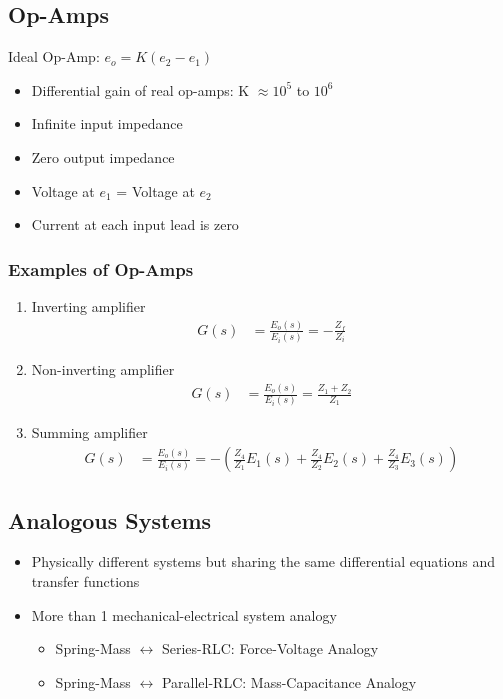 \documentclass[a4paper]{article}
\begin{document}
\subsection{Op-Amps}
\begin{center}
    Ideal Op-Amp: $e_o = K(e_2-e_1)$
\end{center}
\begin{itemize}
    \item Differential gain of real op-amps: K $\approx 10^5$ to $10^6$
    \item Infinite input impedance
    \item Zero output impedance
    \item Voltage at $e_1$ = Voltage at $e_2$
    \item Current at each input lead is zero
\end{itemize}
\subsubsection{Examples of Op-Amps}
\begin{enumerate}[label=\alph*.]
    \item Inverting amplifier
    \begin{align*}
        G(s) &= \frac{E_o(s)}{E_i(s)} = -\frac{Z_f}{Z_i}
    \end{align*}
    \item Non-inverting amplifier
    \begin{align*}
        G(s) &= \frac{E_o(s)}{E_i(s)} = \frac{Z_1+Z_2}{Z_1}
    \end{align*}
    \item Summing amplifier
    \begin{align*}
        G(s) &= \frac{E_o(s)}{E_i(s)} = -\left(\frac{Z_4}{Z_1}E_1(s)+\frac{Z_4}{Z_2}E_2(s)+\frac{Z_4}{Z_3}E_3(s)\right)
    \end{align*}
\end{enumerate}
\subsection{Analogous Systems}
\begin{itemize}
    \item Physically different systems but sharing the same differential equations and transfer functions
    \item More than 1 mechanical-electrical system analogy
    \begin{itemize}[label=$\circ$]
        \item Spring-Mass $\leftrightarrow$ Series-RLC: Force-Voltage Analogy
        \item Spring-Mass $\leftrightarrow$ Parallel-RLC: Mass-Capacitance Analogy
    \end{itemize}
\end{itemize}
\end{document}
